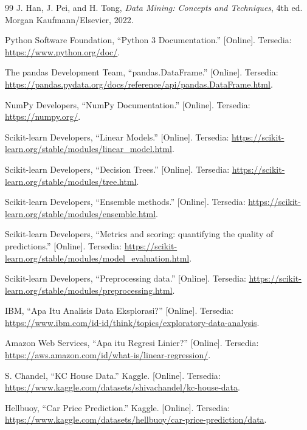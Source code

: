 \documentclass[a4paper,oneside,12pt]{report}
\renewcommand{\bibname}{Daftar Pustaka}
\begin{document}
\clearpage
{}
\renewcommand{\bibname}{Daftar Pustaka}
\begin{thebibliography}{99}
     J. Han, J. Pei, and H. Tong, \textit{Data Mining: Concepts and Techniques}, 4th ed. Morgan Kaufmann/Elsevier, 2022.

     Python Software Foundation, ``Python 3 Documentation.'' [Online]. Tersedia: \url{https://www.python.org/doc/}.

     The pandas Development Team, ``pandas.DataFrame.'' [Online]. Tersedia: \url{https://pandas.pydata.org/docs/reference/api/pandas.DataFrame.html}.

     NumPy Developers, ``NumPy Documentation.'' [Online]. Tersedia: \url{https://numpy.org/}.

     Scikit-learn Developers, ``Linear Models.'' [Online]. Tersedia: \url{https://scikit-learn.org/stable/modules/linear_model.html}.

     Scikit-learn Developers, ``Decision Trees.'' [Online]. Tersedia: \url{https://scikit-learn.org/stable/modules/tree.html}.

     Scikit-learn Developers, ``Ensemble methods.'' [Online]. Tersedia: \url{https://scikit-learn.org/stable/modules/ensemble.html}.

     Scikit-learn Developers, ``Metrics and scoring: quantifying the quality of predictions.'' [Online]. Tersedia: \url{https://scikit-learn.org/stable/modules/model_evaluation.html}.

     Scikit-learn Developers, ``Preprocessing data.'' [Online]. Tersedia: \url{https://scikit-learn.org/stable/modules/preprocessing.html}.

     IBM, ``Apa Itu Analisis Data Eksplorasi?'' [Online]. Tersedia: \url{https://www.ibm.com/id-id/think/topics/exploratory-data-analysis}.

     Amazon Web Services, ``Apa itu Regresi Linier?'' [Online]. Tersedia: \url{https://aws.amazon.com/id/what-is/linear-regression/}.

     S. Chandel, ``KC House Data.'' Kaggle. [Online]. Tersedia: \url{https://www.kaggle.com/datasets/shivachandel/kc-house-data}.

     Hellbuoy, ``Car Price Prediction.'' Kaggle. [Online]. Tersedia: \url{https://www.kaggle.com/datasets/hellbuoy/car-price-prediction/data}.


\end{thebibliography}
\end{document}
